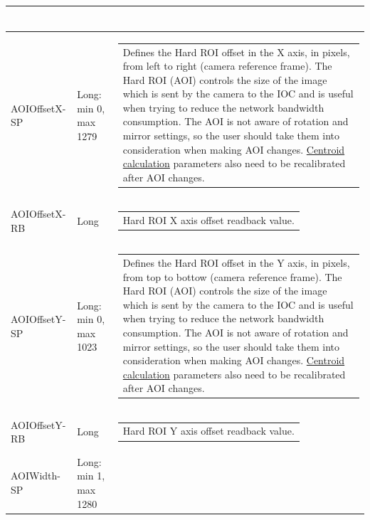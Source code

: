 \documentclass[openany]{article}
\begin{document}
\begin{longtable}{| m{3.0cm} m{4.5cm}  m{7.0cm} |}
\begin{tabular}{@{}m{6cm}@{}}
            \end{tabular} \hypertarget{pv:hard-roi-off-x}{}\\ \hline
        AOIOffsetX-SP & Long: min 0, max 1279 & \begin{tabular}{@{}m{6cm}@{}}
                Defines the Hard ROI offset in the X axis, in pixels, from left to right
                (camera reference frame). The Hard ROI (AOI) controls the size of the image
                which is sent by the camera to the IOC and is useful when trying to reduce
                the network bandwidth consumption. The AOI is not aware of rotation and
                mirror settings, so the user should take them into consideration when making
                AOI changes. \hyperref[sec:centroid-calc]{Centroid calculation} parameters
                also need to be recalibrated after AOI changes.
            \end{tabular} \\ \hline
        AOIOffsetX-RB & Long & \begin{tabular}{@{}m{6cm}@{}}
                Hard ROI X axis offset readback value.
            \end{tabular} \hypertarget{pv:hard-roi-off-y}{}\\ \hline
        AOIOffsetY-SP & Long: min 0, max 1023 & \begin{tabular}{@{}m{6cm}@{}}
                Defines the Hard ROI offset in the Y axis, in pixels, from top to bottow
                (camera reference frame). The Hard ROI (AOI) controls the size of the image
                which is sent by the camera to the IOC and is useful when trying to reduce
                the network bandwidth consumption. The AOI is not aware of rotation and
                mirror settings, so the user should take them into consideration when making
                AOI changes. \hyperref[sec:centroid-calc]{Centroid calculation} parameters
                also need to be recalibrated after AOI changes.
            \end{tabular} \\ \hline
        AOIOffsetY-RB & Long & \begin{tabular}{@{}m{6cm}@{}}
                Hard ROI Y axis offset readback value.
            \end{tabular} \hypertarget{pv:hard-roi-width}{}\\ \hline
        AOIWidth-SP & Long: min 1, max 1280 & \begin{tabular}{@{}m{6cm}@{}}

\end{tabular}
\end{longtable}
\end{document}
